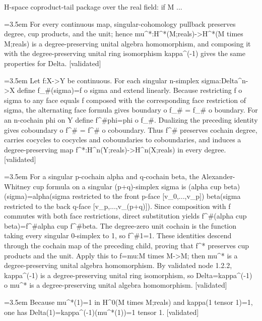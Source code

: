 \documentclass{article}
\newcommand{\step}[1]{\par\noindent\hangindent=3.5em\hangafter=1%
  \makebox[3.5em][l]{\textbf{#1.}}}
\newcommand{\steptag}[1]{\hfill{\small\textsf{[#1]}}}
\begin{document}
\begin{proofbox}{H-space coproduct-tail package over the real field: if M ...}
\step{1.3.1} For every continuous map, singular-cohomology pullback preserves degree, cup products, and the unit; hence mu\textasciicircum{}*:H\textasciicircum{}*(M;reals)->H\textasciicircum{}*(M times M;reals) is a degree-preserving unital algebra homomorphism, and composing it with the degree-preserving unital ring isomorphism kappa\textasciicircum{}(-1) gives the same properties for Delta. \steptag{validated} \\[6pt]
\step{1.3.1.1} Let f:X->Y be continuous. For each singular n-simplex sigma:Delta\textasciicircum{}n->X define f\_\#(sigma)=f o sigma and extend linearly. Because restricting f o sigma to any face equals f composed with the corresponding face restriction of sigma, the alternating face formula gives boundary o f\_\# = f\_\# o boundary. For an n-cochain phi on Y define f\textasciicircum{}\#phi=phi o f\_\#. Dualizing the preceding identity gives coboundary o f\textasciicircum{}\# = f\textasciicircum{}\# o coboundary. Thus f\textasciicircum{}\# preserves cochain degree, carries cocycles to cocycles and coboundaries to coboundaries, and induces a degree-preserving map f\textasciicircum{}*:H\textasciicircum{}n(Y;reals)->H\textasciicircum{}n(X;reals) in every degree. \steptag{validated} \\[4pt]
\step{1.3.1.2} For a singular p-cochain alpha and q-cochain beta, the Alexander-Whitney cup formula on a singular (p+q)-simplex sigma is (alpha cup beta)(sigma)=alpha(sigma restricted to the front p-face [v\_0,...,v\_p]) beta(sigma restricted to the back q-face [v\_p,...,v\_(p+q)]). Since composition with f commutes with both face restrictions, direct substitution yields f\textasciicircum{}\#(alpha cup beta)=f\textasciicircum{}\#alpha cup f\textasciicircum{}\#beta. The degree-zero unit cochain is the function taking every singular 0-simplex to 1, so f\textasciicircum{}\#1=1. These identities descend through the cochain map of the preceding child, proving that f\textasciicircum{}* preserves cup products and the unit. Apply this to f=mu:M times M->M; then mu\textasciicircum{}* is a degree-preserving unital algebra homomorphism. By validated node 1.2.2, kappa\textasciicircum{}(-1) is a degree-preserving unital ring isomorphism, so Delta=kappa\textasciicircum{}(-1) o mu\textasciicircum{}* is a degree-preserving unital algebra homomorphism. \steptag{validated} \\[4pt]
\step{1.3.2} Because mu\textasciicircum{}*(1)=1 in H\textasciicircum{}0(M times M;reals) and kappa(1 tensor 1)=1, one has Delta(1)=kappa\textasciicircum{}(-1)(mu\textasciicircum{}*(1))=1 tensor 1. \steptag{validated} \\[4pt]

\end{proofbox}
\end{document}
